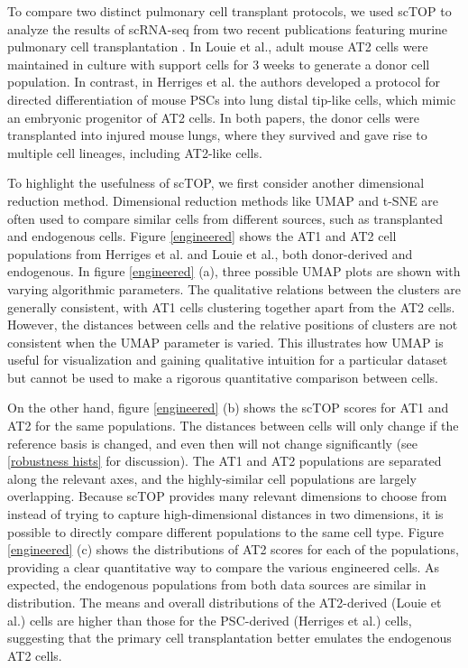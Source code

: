 \documentclass[vruler,JEB]{COB}%
\begin{document}
To compare two distinct pulmonary cell transplant protocols, we used scTOP to analyze the results of scRNA-seq from two recent publications featuring murine pulmonary cell transplantation \citep{herriges_durable_2022, louie_progenitor_2022}. In Louie et al., adult mouse AT2 cells were maintained in culture with support cells for 3 weeks to generate a donor cell population. In contrast, in Herriges et al. the authors developed a protocol for directed differentiation of mouse PSCs into lung distal tip-like cells, which mimic an embryonic progenitor of AT2 cells. In both papers, the donor cells were transplanted into injured mouse lungs, where they survived and gave rise to multiple cell lineages, including AT2-like cells.

To highlight the usefulness of scTOP, we first consider another dimensional reduction method. Dimensional reduction methods like UMAP and t-SNE are often used to compare similar cells from different sources, such as transplanted and endogenous cells. Figure \ref{engineered} shows the AT1 and AT2 cell populations from Herriges et al. and Louie et al., both donor-derived and endogenous. In figure \ref{engineered} (a), three possible UMAP plots are shown with varying algorithmic parameters. The qualitative relations between the clusters are generally consistent, with AT1 cells clustering together apart from the AT2 cells. However, the distances between cells and the relative positions of clusters are not consistent when the UMAP parameter is varied. This illustrates how UMAP is useful for visualization and gaining qualitative intuition for a particular dataset but cannot be used to make a rigorous quantitative comparison between cells.

On the other hand, figure \ref{engineered} (b) shows the scTOP scores for AT1 and AT2 for the same populations. The distances between cells will only change if the reference basis is changed, and even then will not change significantly (see \ref{robustness hists} for discussion). The AT1 and AT2 populations are separated along the relevant axes, and the highly-similar cell populations are largely overlapping. Because scTOP provides many relevant dimensions to choose from instead of trying to capture high-dimensional distances in two dimensions, it is possible to directly compare different populations to the same cell type. Figure \ref{engineered} (c) shows the distributions of AT2 scores for each of the populations, providing a clear quantitative way to compare the various engineered cells. As expected, the endogenous populations from both data sources are similar in distribution. The means and overall distributions of the AT2-derived (Louie et al.) cells are higher than those for the PSC-derived (Herriges et al.) cells, suggesting that the primary cell transplantation better emulates the endogenous AT2 cells.
\end{document}
